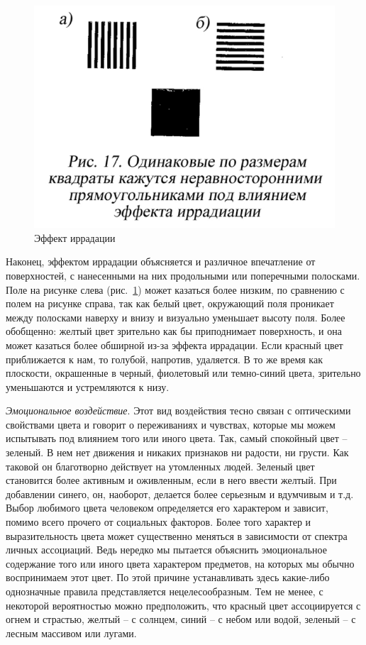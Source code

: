 \begin{figure}[h!]
  \centering
  \includegraphics[width=.5\linewidth]{images/irradation}
  \caption{Эффект иррадации}
  \label{fig:irradation}
\end{figure}

  Наконец, эффектом иррадации объясняется и различное впечатление от
  поверхностей, с нанесенными на них продольными или поперечными полосками.
  Поле на рисунке слева (рис.~\ref{fig:irradation}) может казаться более низким, по сравнению с полем на рисунке справа, так как белый
  цвет, окружающий поля проникает между полосками наверху и внизу и визуально уменьшает высоту
  поля. Более обобщенно: желтый цвет зрительно как бы приподнимает
  поверхность, и она может казаться более обширной из-за эффекта иррадации. Если красный цвет
  приближается к нам, то голубой, напротив, удаляется. В то же время как плоскости, окрашенные в
  черный, фиолетовый или темно-синий цвета, зрительно уменьшаются и устремляются к низу.

\emph{Эмоциональное воздействие}. Этот вид воздействия тесно связан с
  оптическими свойствами цвета и говорит о переживаниях и чувствах, которые
  мы можем испытывать под влиянием того или иного цвета. Так, самый спокойный
  цвет -- зеленый. В нем нет движения и никаких признаков ни радости, ни грусти.
  Как таковой он благотворно действует на утомленных людей. Зеленый цвет
  становится более активным и оживленным, если в него ввести желтый. При
  добавлении синего, он, наоборот, делается более серьезным и вдумчивым и т.д.
  Выбор любимого цвета человеком определяется его характером и зависит, помимо
  всего прочего от социальных факторов. Более того характер и выразительность
  цвета может существенно меняться в зависимости от спектра личных ассоциаций.
  Ведь нередко мы пытается объяснить эмоциональное содержание того или иного
  цвета характером предметов, на которых мы обычно воспринимаем этот цвет.
  По этой причине устанавливать здесь какие-либо однозначные правила
  представляется нецелесообразным. Тем не менее, с некоторой вероятностью
  можно предположить, что красный цвет ассоциируется с огнем и страстью,
  желтый -- с солнцем, синий -- с небом или водой, зеленый -- с лесным массивом
  или лугами.

